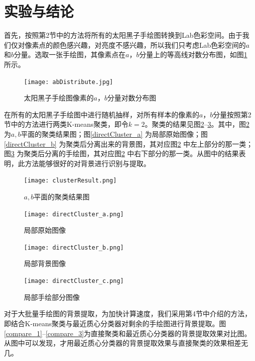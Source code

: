 \documentclass[UTF8,a4paper,twoside]{ctexart}
\begin{document}
\section{实验与结论}

首先，按照第2节中的方法将所有的太阳黑子手绘图转换到Lab色彩空间。由于我们仅对像素点的颜色感兴趣，对亮度不感兴趣，所以我们只考虑Lab色彩空间的$a$和$b$分量。选取一张手绘图，其像素点在$a$，$b$分量上的等高线对数分布图，如图\ref{abDistribute} 所示。

\begin{figure}[H]
  \centering
  \texttt{[image: abDistribute.jpg]}
  \caption{太阳黑子手绘图像素的$a$，$b$分量对数分布图}\label{abDistribute}
\end{figure}

在所有的太阳黑子手绘图中进行随机抽样，对所有样本的像素的$a$，$b$分量按照第2节中的方法进行两类K-means聚类，即令$k = 2$。聚类的结果见图\ref{clusterResult}--\ref{directCluster_c}。其中，图\ref{clusterResult} 为$a,b$平面的聚类结果图；图\ref{directCluster_a} 为局部原始图像；图\ref{directCluster_b} 为聚类后分离出来的背景图，其对应图\ref{clusterResult} 中左上部分的那一类；图\ref{directCluster_c} 为聚类后分离的手绘图，其对应图\ref{clusterResult} 中右下部分的那一类。从图中的结果表明，此方法能够很好的对背景进行识别与提取。

\begin{figure}[H]
  \centering
  \texttt{[image: clusterResult.png]}
  \caption{$a, b$平面的聚类结果图}
  \label{clusterResult}
\end{figure}

\begin{figure}[H]
  \centering
  \begin{minipage}{5cm}
    \centering
    \texttt{[image: directCluster\_a.png]}
    \caption{局部原始图像}
    \label{directCluster_a}
  \end{minipage}
  \hspace{0.2cm}%
  \begin{minipage}{5cm}
    \centering
    \texttt{[image: directCluster\_b.png]}
    \caption{局部背景图像}
    \label{directCluster_b}
  \end{minipage}
  \hspace{0.2cm}%
  \begin{minipage}{5cm}
    \centering
    \texttt{[image: directCluster\_c.png]}
    \caption{局部手绘部分图像}
    \label{directCluster_c}
  \end{minipage}
\end{figure}

对于大批量手绘图的背景提取，为加快计算速度，我们采用第4节中介绍的方法，即结合K-means聚类与最近质心分类器对剩余的手绘图进行背景提取。图\ref{compare_1}--\ref{compare_3}为直接聚类和最近质心分类器的背景提取效果对比图。从图中可以发现，才用最近质心分类器的背景提取效果与直接聚类的效果相差无几。
\end{document}
